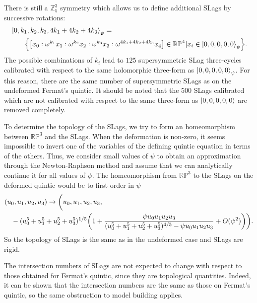 There is still a $\mathbb Z_5^3$ symmetry which allows us to define additional SLags by successive rotations:
\begin{align}
 &\ket{0,k_1,k_2,k_3,4k_1+4k_2+4k_3}_\psi=\nonumber\\
 &\qquad\qty{\qty[x_0:\omega^{k_1}x_1:\omega^{k_2}x_2:\omega^{k_3}x_3:\omega^{4k_1+4k_2+4k_3}x_4]\in  \mathbb{RP}^4|x_i\in\ket{0,0,0,0,0}_\psi}.
\end{align}
The possible combinations of $k_i$ lead to $125$ supersymmetric SLag three-cycles
calibrated with respect to the same holomorphic three-form as $\ket{0,0,0,0,0}_{\psi}$.
For this reason, there are the same number of supersymmetric SLags as on the undeformed Fermat's quintic.
It should be noted that the $500$ SLags calibrated which are not calibrated with respect to the same three-form as $\ket{0,0,0,0,0}$ 
are removed completely.
 
To determine the topology of the SLags, we try to form an homeomorphism between $\mathbb{RP}^3$ and the SLags.
When the deformation is non-zero, it seems impossible to invert one of the variables of the defining
quintic equation in terms of the others.
Thus, we consider small values of $\psi$ to obtain an approximation through the Newton-Raphson method
and assume that we can analytically continue it for all values of $\psi$.
The homeomorphism from $\mathbb{RP}^3$ to the SLags on the deformed quintic would be to first order in $\psi$
\begin{align}
  &(u_0,u_1,u_2,u_3) \to \bigg(u_0,u_1,u_2,u_3,\nonumber\\
  &\quad-(u_0^5+u_1^5+u_2^5+u_3^5)^{1/5} \qty(1+\frac{\psi u_0u_1u_2u_3}{(u_0^5+u_1^5+u_2^5+u_3^5)^{4/5}-\psi u_0u_1u_2u_3}+O(\psi^2))\bigg).
\end{align}
So the topology of SLags is the same as in the  undeformed case and SLags are rigid.

The intersection numbers of SLags are not expected to change with respect to those obtained for Fermat's
quintic, since they are topological quantities.
Indeed, it can be shown that the intersection numbers are the same as those on Fermat's quintic, so
the same obstruction to model building applies.

